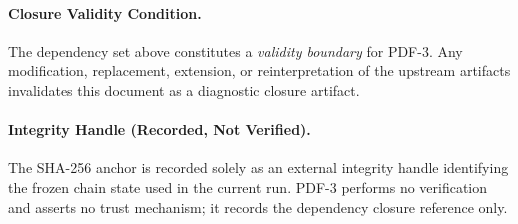 \paragraph{Closure Validity Condition.}
The dependency set above constitutes a \emph{validity boundary} for PDF-3.
Any modification, replacement, extension, or reinterpretation
of the upstream artifacts invalidates this document
as a diagnostic closure artifact.

\paragraph{Integrity Handle (Recorded, Not Verified).}
The SHA-256 anchor is recorded solely as an external integrity handle
identifying the frozen chain state used in the current run.
PDF-3 performs no verification and asserts no trust mechanism;
it records the dependency closure reference only.
